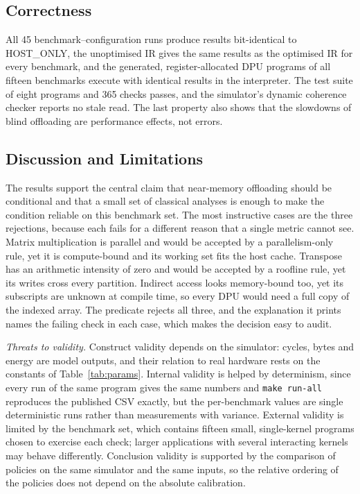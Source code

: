 \documentclass{ieeeaccess}
\begin{document}
\subsection{Correctness}
All 45 benchmark--configuration runs produce results bit-identical to HOST\_ONLY, the unoptimised IR gives the same results as the optimised IR for every benchmark, and the generated, register-allocated DPU programs of all fifteen benchmarks execute with identical results in the interpreter. The test suite of eight programs and 365 checks passes, and the simulator's dynamic coherence checker reports no stale read. The last property also shows that the slowdowns of blind offloading are performance effects, not errors.

\subsection{Discussion and Limitations}
The results support the central claim that near-memory offloading should be conditional and that a small set of classical analyses is enough to make the condition reliable on this benchmark set. The most instructive cases are the three rejections, because each fails for a different reason that a single metric cannot see. Matrix multiplication is parallel and would be accepted by a parallelism-only rule, yet it is compute-bound and its working set fits the host cache. Transpose has an arithmetic intensity of zero and would be accepted by a roofline rule, yet its writes cross every partition. Indirect access looks memory-bound too, yet its subscripts are unknown at compile time, so every DPU would need a full copy of the indexed array. The predicate rejects all three, and the explanation it prints names the failing check in each case, which makes the decision easy to audit.

\emph{Threats to validity.} Construct validity depends on the simulator: cycles, bytes and energy are model outputs, and their relation to real hardware rests on the constants of Table~\ref{tab:params}. Internal validity is helped by determinism, since every run of the same program gives the same numbers and \texttt{make run-all} reproduces the published CSV exactly, but the per-benchmark values are single deterministic runs rather than measurements with variance. External validity is limited by the benchmark set, which contains fifteen small, single-kernel programs chosen to exercise each check; larger applications with several interacting kernels may behave differently. Conclusion validity is supported by the comparison of policies on the same simulator and the same inputs, so the relative ordering of the policies does not depend on the absolute calibration.
\end{document}
